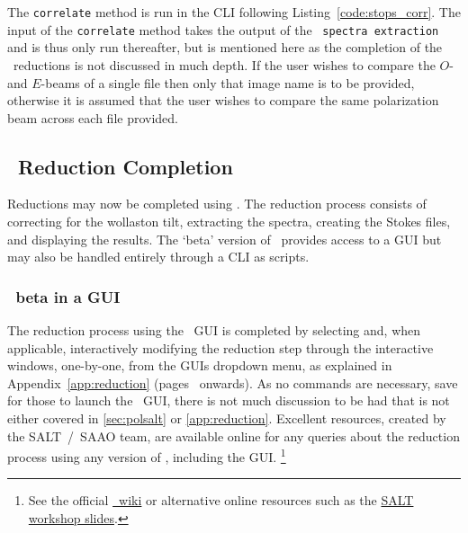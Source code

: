 The \texttt{correlate} method is run in the \gls{CLI} following Listing~\ref{code:stops_corr}. The input of the \texttt{correlate} method takes the output of the \polsalt\ \texttt{spectra extraction} and is thus only run thereafter, but is mentioned here as the completion of the \polsalt\ reductions is not discussed in much depth. If the user wishes to compare the $O$- and $E$-beams of a single file then only that image name is to be provided, otherwise it is assumed that the user wishes to compare the same polarization beam across each file provided.

\subsection{\polsalt\ Reduction Completion} \label{subsec:reduc_com}

Reductions may now be completed using \polsalt. The reduction process consists of correcting for the wollaston tilt, extracting the spectra, creating the Stokes files, and displaying the results. The `beta' version of \polsalt\ provides access to a \gls{GUI} but may also be handled entirely through a \gls{CLI} as scripts.

\subsubsection{\polsalt\ beta in a \gls{GUI}}

The reduction process using the \polsalt\ \gls{GUI} is completed by selecting and, when applicable, interactively modifying the reduction step through the interactive windows, one-by-one, from the \glspl{GUI} dropdown menu, as explained in Appendix~\ref{app:reduction} (pages~\pageref{code:stops_corr} onwards). As no commands are necessary, save for those to launch the \polsalt\ \gls{GUI}, there is not much discussion to be had that is not either covered in \autoref{sec:polsalt} or \autoref{app:reduction}. Excellent resources, created by the \gls{SALT}~/~\gls{SAAO} team, are available online for any queries about the reduction process using any version of \polsalt, including the \gls{GUI}.%
\footnote{See the official \href{https://github.com/saltastro/polsalt/wiki}{\polsalt\ wiki} or alternative online resources such as the \href{https://saltworkshop2022.salt.ac.za/wp-content/uploads/2022/11/DG_polsalt_SALT_workshop_2022_finalversion.pdf}{\gls{SALT} workshop slides}.}


